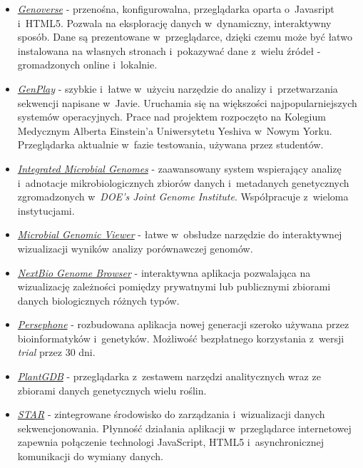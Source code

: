 \begin{itemize}
	\item \href{http://wtsi-web.github.io/Genoverse/}{\emph{Genoverse}} - przenośna, konfigurowalna, przeglądarka oparta o~Javasript i~HTML5. Pozwala na eksplorację danych w~dynamiczny, interaktywny sposób. Dane są prezentowane w~przeglądarce, dzięki czemu może być łatwo instalowana na własnych stronach i~pokazywać dane z~wielu źródeł - gromadzonych online i~lokalnie.
	
	\item \href{http://genplay.einstein.yu.edu/}{\emph{GenPlay}} - szybkie i~łatwe w~użyciu narzędzie do analizy i~przetwarzania sekwencji napisane w~Javie. Uruchamia się na większości najpopularniejszych systemów operacyjnych. Prace nad projektem rozpoczęto na Kolegium Medycznym Alberta Einstein'a Uniwersytetu Yeshiva w~Nowym Yorku. Przeglądarka aktualnie w~fazie testowania, używana przez studentów.
	
	\item \href{http://img.jgi.doe.gov/}{\emph{Integrated Microbial Genomes}} - zaawansowany system wspierający analizę i~adnotacje mikrobiologicznych zbiorów danych i~metadanych genetycznych zgromadzonych w~\emph{DOE's Joint Genome Institute}. Współpracuje z~wieloma instytucjami.
	
	\item \href{http://mgv2.cmbi.ru.nl/}{\emph{Microbial Genomic Viewer}} - łatwe w~obsłudze narzędzie do interaktywnej wizualizacji wyników analizy porównawczej genomów. 
	
	\item \href{https://www.nextbio.com}{\emph{NextBio Genome Browser}} - interaktywna aplikacja pozwalająca na wizualizację zależności pomiędzy prywatnymi lub publicznymi zbiorami danych biologicznych różnych typów.
	
	\item \href{http://persephone.net/}{\emph{Persephone}} - rozbudowana aplikacja nowej generacji szeroko używana przez bioinformatyków i~genetyków. Możliwość bezpłatnego korzystania z~wersji \emph{trial} przez 30 dni.
	
	\item \href{http://www.plantgdb.org/}{\emph{PlantGDB}} - przeglądarka z~zestawem narzędzi analitycznych wraz ze zbiorami danych genetycznych wielu roślin.
	
	\item \href{http://tabit.ucsd.edu/}{\emph{STAR}} - zintegrowane środowisko do zarządzania i~wizualizacji danych sekwencjonowania. Płynność działania aplikacji w~przeglądarce internetowej zapewnia połączenie technologi JavaScript, HTML5 i~asynchronicznej komunikacji do wymiany danych. 
	

\end{itemize}
